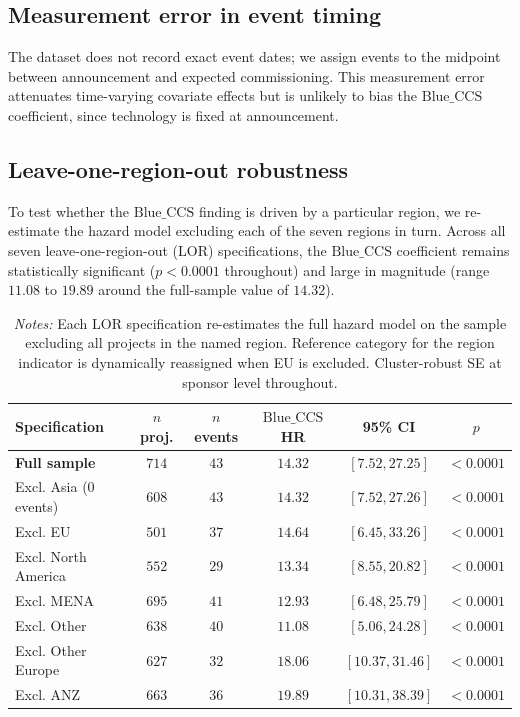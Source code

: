 \documentclass[11pt,a4paper]{article}
\newcommand{\BlueCCS}{\mathrm{Blue\_CCS}}
\begin{document}
\subsection{Measurement error in event timing}

The dataset does not record exact event dates; we assign events to the midpoint between announcement and expected commissioning. This measurement error attenuates time-varying covariate effects but is unlikely to bias the $\BlueCCS$ coefficient, since technology is fixed at announcement.

\subsection{Leave-one-region-out robustness}

To test whether the $\BlueCCS$ finding is driven by a particular region, we re-estimate the hazard model excluding each of the seven regions in turn. Across all seven leave-one-region-out (LOR) specifications, the $\BlueCCS$ coefficient remains statistically significant ($p < 0.0001$ throughout) and large in magnitude (range $11.08$ to $19.89$ around the full-sample value of $14.32$).

\begin{table}[H]
\centering
\caption{Leave-one-region-out robustness.}
\label{tab:lor}
\small
\begin{tabular}{lccccc}
\toprule
\textbf{Specification} & \textbf{$n$ proj.} & \textbf{$n$ events} & \textbf{$\BlueCCS$ HR} & \textbf{95\% CI} & \textbf{$p$} \\
\midrule
\textbf{Full sample} & $714$ & $43$ & $\mathbf{14.32}$ & $[7.52, 27.25]$ & $<0.0001$ \\
Excl. Asia (0 events) & $608$ & $43$ & $14.32$ & $[7.52, 27.26]$ & $<0.0001$ \\
Excl. EU & $501$ & $37$ & $14.64$ & $[6.45, 33.26]$ & $<0.0001$ \\
Excl. North America & $552$ & $29$ & $13.34$ & $[8.55, 20.82]$ & $<0.0001$ \\
Excl. MENA & $695$ & $41$ & $12.93$ & $[6.48, 25.79]$ & $<0.0001$ \\
Excl. Other & $638$ & $40$ & $11.08$ & $[5.06, 24.28]$ & $<0.0001$ \\
Excl. Other Europe & $627$ & $32$ & $18.06$ & $[10.37, 31.46]$ & $<0.0001$ \\
Excl. ANZ & $663$ & $36$ & $19.89$ & $[10.31, 38.39]$ & $<0.0001$ \\
\bottomrule
\end{tabular}
\caption*{\footnotesize \textit{Notes:} Each LOR specification re-estimates the full hazard model on the sample excluding all projects in the named region. Reference category for the region indicator is dynamically reassigned when EU is excluded. Cluster-robust SE at sponsor level throughout.}
\end{table}
\end{document}
